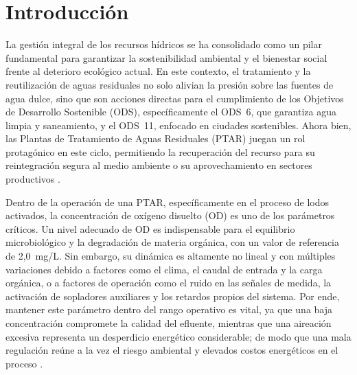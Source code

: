 \chapter{Introducción}
\label{cap:introduccion}

La gestión integral de los recursos hídricos se ha consolidado como un pilar
fundamental para garantizar la sostenibilidad ambiental y el bienestar social
frente al deterioro ecológico actual. En este contexto, el tratamiento y la
reutilización de aguas residuales no solo alivian la presión sobre las fuentes
de agua dulce, sino que son acciones directas para el cumplimiento de los
Objetivos de Desarrollo Sostenible (ODS), específicamente el ODS~6, que
garantiza agua limpia y saneamiento, y el ODS~11, enfocado en ciudades
sostenibles. Ahora bien, las Plantas de Tratamiento de Aguas Residuales (PTAR)
juegan un rol protagónico en este ciclo, permitiendo la recuperación del
recurso para su reintegración segura al medio ambiente o su aprovechamiento en
sectores productivos \cite{un2015sdg,khalid2018review}.

Dentro de la operación de una PTAR, específicamente en el proceso de lodos
activados, la concentración de oxígeno disuelto (OD) es uno de los parámetros
críticos. Un nivel adecuado de OD es indispensable para el equilibrio
microbiológico y la degradación de materia orgánica, con un valor de
referencia de 2,0~mg/L. Sin embargo,
su dinámica es altamente no lineal y con múltiples variaciones debido a factores
como el clima, el caudal de entrada y la carga orgánica, o a factores de
operación como el ruido en las señales de medida, la activación de sopladores
auxiliares y los retardos propios del sistema. Por ende, mantener este
parámetro dentro del rango operativo es vital, ya que una baja concentración
compromete la calidad del efluente, mientras que una aireación excesiva
representa un desperdicio energético considerable; de modo que una mala
regulación reúne a la vez el riesgo ambiental y elevados costos energéticos en
el proceso \cite{wei2020disturbance,amand2013review}.

